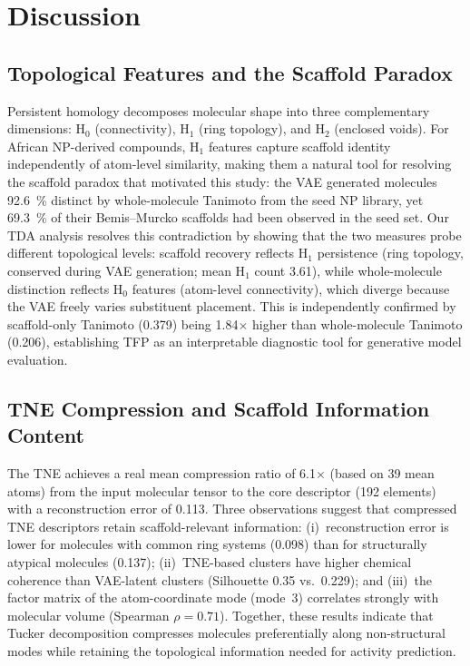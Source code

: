 \documentclass[11pt,a4paper]{article}
\begin{document}

\section{Discussion}

\subsection{Topological Features and the Scaffold Paradox}

Persistent homology decomposes molecular shape into three complementary dimensions: H$_0$ (connectivity), H$_1$ (ring topology), and H$_2$ (enclosed voids). For African NP-derived compounds, H$_1$ features capture scaffold identity independently of atom-level similarity, making them a natural tool for resolving the scaffold paradox that motivated this study: the VAE generated molecules \qty{92.6}{\percent} distinct by whole-molecule Tanimoto from the seed NP library, yet \qty{69.3}{\percent} of their Bemis--Murcko scaffolds had been observed in the seed set. Our TDA analysis resolves this contradiction by showing that the two measures probe different topological levels: scaffold recovery reflects H$_1$ persistence (ring topology, conserved during VAE generation; mean H$_1$ count \num{3.61}), while whole-molecule distinction reflects H$_0$ features (atom-level connectivity), which diverge because the VAE freely varies substituent placement. This is independently confirmed by scaffold-only Tanimoto (\num{0.379}) being \num{1.84}$\times$ higher than whole-molecule Tanimoto (\num{0.206}), establishing TFP as an interpretable diagnostic tool for generative model evaluation.

\subsection{TNE Compression and Scaffold Information Content}

The TNE achieves a real mean compression ratio of \num{6.1}$\times$ (based on \num{39} mean atoms) from the input molecular tensor to the core descriptor (\num{192} elements) with a reconstruction error of \num{0.113}. Three observations suggest that compressed TNE descriptors retain scaffold-relevant information: (i)~reconstruction error is lower for molecules with common ring systems (\num{0.098}) than for structurally atypical molecules (\num{0.137}); (ii)~TNE-based clusters have higher chemical coherence than VAE-latent clusters (Silhouette \num{0.35} vs.\ \num{0.229}); and (iii)~the factor matrix of the atom-coordinate mode (mode~3) correlates strongly with molecular volume (Spearman $\rho = \num{0.71}$). Together, these results indicate that Tucker decomposition compresses molecules preferentially along non-structural modes while retaining the topological information needed for activity prediction.
\end{document}
